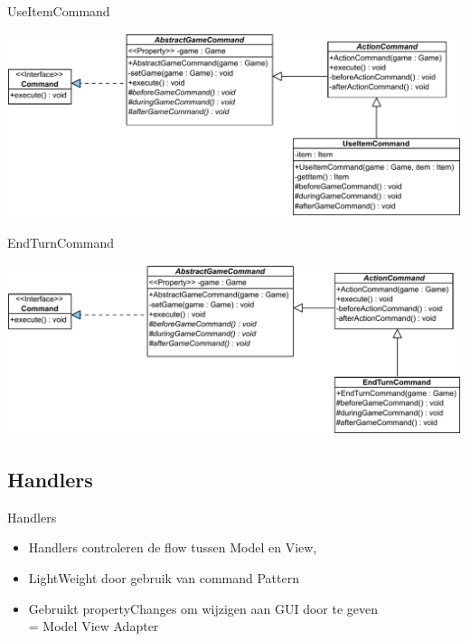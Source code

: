 \documentclass[11pt,t]{beamer}
\begin{document}
\begin{frame}{UseItemCommand}
\begin{center}
\includegraphics[width=0.95\linewidth]{images/useitemcommand}
\end{center}

\end{frame}

\begin{frame}{EndTurnCommand}
\begin{center}
\includegraphics[width=0.95\linewidth]{images/endturncommand}
\end{center}
\end{frame}

\subsection{Handlers}

\begin{frame}{Handlers}
\begin{itemize}
\item Handlers controleren de flow tussen Model en View,
\item LightWeight door gebruik van command Pattern
\item Gebruikt propertyChanges om wijzigen aan GUI door te geven \\
= Model View Adapter
\end{itemize}
\end{frame}
\end{document}
